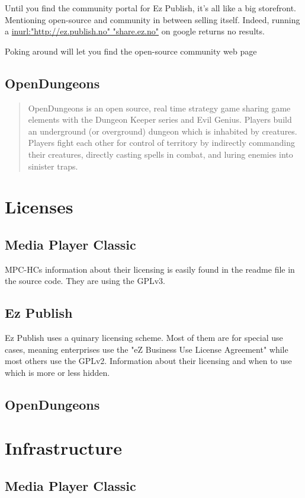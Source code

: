 \documentclass{report} %
\begin{document}
Until you find the community portal for Ez Publish, it's all like a big storefront. Mentioning open-source and community in between selling itself. Indeed, running a \url{inurl:"http://ez.publish.no" "share.ez.no"} on google returns no results.

Poking around will let you find the open-source community web page\cite{ezcomweb}

\subsection{OpenDungeons}
\begin{quotation}
OpenDungeons is an open source, real time strategy game sharing game elements with the Dungeon Keeper series and Evil Genius. Players build an underground (or overground) dungeon which is inhabited by creatures. Players fight each other for control of territory by indirectly commanding their creatures, directly casting spells in combat, and luring enemies into sinister traps.\cite{odwebabout}
\end{quotation}


\section{Licenses}
\subsection{Media Player Classic}
MPC-HCs information about their licensing is easily found in the readme file in the source code\cite{mpcsource}. They are using the GPLv3\cite{gplv3}.
\subsection{Ez Publish}
Ez Publish uses a quinary licensing scheme\cite{ezpubweblicenses}. Most of them are for special use cases, meaning enterprises use the "eZ Business Use License Agreement" while most others use the GPLv2\cite{gplv2}. Information about their licensing and when to use which is more or less hidden.
\subsection{OpenDungeons}

\section{Infrastructure}
\subsection{Media Player Classic}
\end{document}
